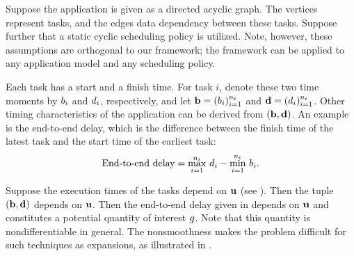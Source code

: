 Suppose the application is given as a directed acyclic graph. The vertices
represent tasks, and the edges data dependency between these tasks. Suppose
further that a static cyclic scheduling policy is utilized. Note, however, these
assumptions are orthogonal to our framework; the framework can be applied to any
application model and any scheduling policy.

Each task has a start and a finish time. For task $i$, denote these two time
moments by $b_i$ and $d_i$, respectively, and let $\mathbf{b} = (b_i)_{i=1}^{n_t}$ and
$\mathbf{d} = (d_i)_{i=1}^{n_t}$. Other timing characteristics of the application can be
derived from $(\mathbf{b}, \mathbf{d})$. An example is the end-to-end delay, which is the
difference between the finish time of the latest task and the start time of the
earliest task:
\begin{equation} \elab{end-to-end-delay}
  \text{End-to-end delay} = \max_{i = 1}^\nt \, \d_i - \min_{i = 1}^\nt \, \b_i.
\end{equation}

Suppose the execution times of the tasks depend on $\mathbf{u}$ (see ).
Then the tuple $(\mathbf{b}, \mathbf{d})$ depends on $\mathbf{u}$. Then the end-to-end delay given in
 depends on $\mathbf{u}$ and constitutes a potential quantity of
interest $g$. Note that this quantity is nondifferentiable in general. The
nonsmoothness makes the problem difficult for such techniques as 
expansions, as illustrated in .
